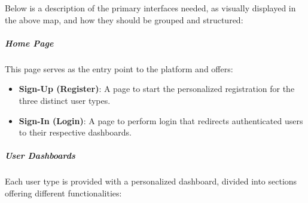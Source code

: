 Below is a description of the primary interfaces needed, as visually displayed in the above map, and how they should be grouped and structured:

\subparagraph{Home Page}
This page serves as the entry point to the platform and offers:
\begin{itemize}
    \item \textbf{Sign-Up (Register)}: A page to start the personalized registration for the three distinct user types.
    \item \textbf{Sign-In (Login)}: A page to perform login that redirects authenticated users to their respective dashboards.
\end{itemize}

\subparagraph{User Dashboards}
Each user type is provided with a personalized dashboard, divided into sections offering different functionalities:

